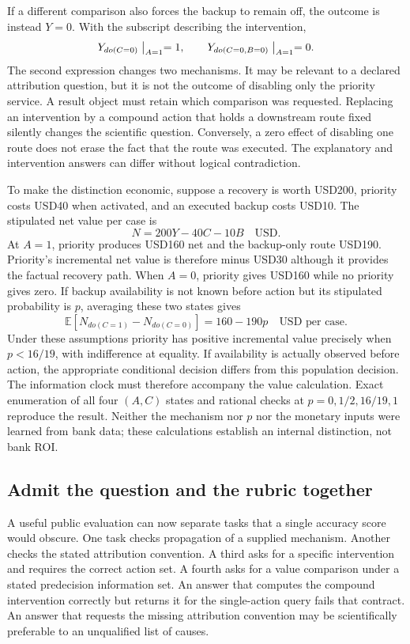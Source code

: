 If a different comparison also forces the backup to remain off, the outcome
is instead $Y=0$. With the subscript describing the intervention,
\begin{equation}
 Y_{do(C=0)}\bigm|_{A=1}=1,\qquad
 Y_{do(C=0,B=0)}\bigm|_{A=1}=0.
 \label{exec18:reasoning-interventions}
\end{equation}
The second expression changes two mechanisms. It may be relevant to a
declared attribution question, but it is not the outcome of disabling only
the priority service. A result object must retain which comparison was
requested. Replacing an intervention by a compound action that holds a
downstream route fixed silently changes the scientific question. Conversely,
a zero effect of disabling one route does not erase the fact that the route
was executed. The explanatory and intervention answers can differ without
logical contradiction.

To make the distinction economic, suppose a recovery is worth USD200,
priority costs USD40 when activated, and an executed backup costs USD10.
The stipulated net value per case is
\begin{equation}
 N=200Y-40C-10B\quad\text{USD}.
 \label{exec18:reasoning-money}
\end{equation}
At $A=1$, priority produces USD160 net and the backup-only route USD190.
Priority's incremental net value is therefore minus USD30 although it
provides the factual recovery path. When $A=0$, priority gives USD160 while
no priority gives zero. If backup availability is not known before action
but its stipulated probability is $p$, averaging these two states gives
\begin{equation}
 \mathbb{E}[N_{do(C=1)}-N_{do(C=0)}]
 =160-190p\quad\text{USD per case}.
 \label{exec18:reasoning-threshold}
\end{equation}
Under these assumptions priority has positive incremental value precisely
when $p<16/19$, with indifference at equality. If availability is actually
observed before action, the appropriate conditional decision differs from
this population decision. The information clock must therefore accompany
the value calculation. Exact enumeration of all four $(A,C)$ states and
rational checks at $p=0,1/2,16/19,1$ reproduce the result. Neither the
mechanism nor $p$ nor the monetary inputs were learned from bank data; these
calculations establish an internal distinction, not bank ROI.\citep{exec18_reasoning_reference}

\subsection{Admit the question and the rubric together}
A useful public evaluation can now separate tasks that a single accuracy
score would obscure. One task checks propagation of a supplied mechanism.
Another checks the stated attribution convention. A third asks for a
specific intervention and requires the correct action set. A fourth asks
for a value comparison under a stated predecision information set. An
answer that computes the compound intervention correctly but returns it for
the single-action query fails that contract. An answer that requests the
missing attribution convention may be scientifically preferable to an
unqualified list of causes.

